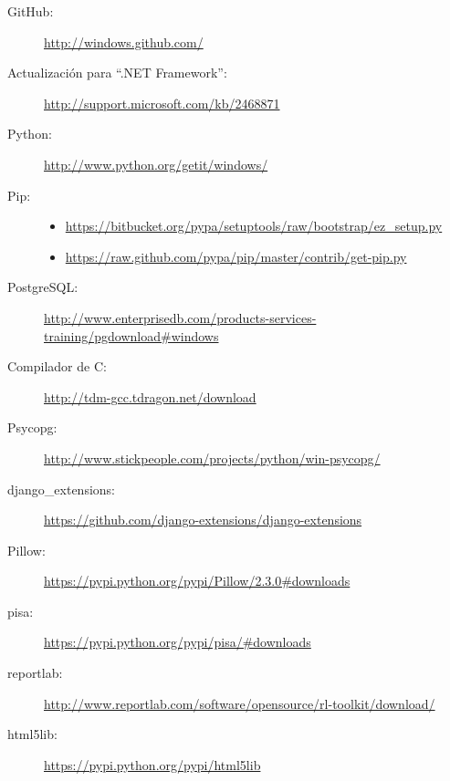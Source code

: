 \documentclass[9pt, letterpaper, oneside]{report}
\begin{document}
    \begin{description}
      \item[GitHub:] \url{http://windows.github.com/}

      \item[Actualización para ``.NET Framework'':]
        \url{http://support.microsoft.com/kb/2468871}

      \item[Python:] \url{http://www.python.org/getit/windows/}

      \item[Pip:]
        \begin{itemize}
          \item \url{https://bitbucket.org/pypa/setuptools/raw/bootstrap/ez\_setup.py}
          \item \url{https://raw.github.com/pypa/pip/master/contrib/get-pip.py}
        \end{itemize}

      \item[PostgreSQL:]
        \url{http://www.enterprisedb.com/products-services-training/pgdownload#windows}

      \item[Compilador de C:] \url{http://tdm-gcc.tdragon.net/download}
      
      \item[Psycopg:] \url{http://www.stickpeople.com/projects/python/win-psycopg/}

      \item[django\_extensions:]
        \url{https://github.com/django-extensions/django-extensions}

      \item[Pillow:] \url{https://pypi.python.org/pypi/Pillow/2.3.0#downloads}

      \item[pisa:] \url{https://pypi.python.org/pypi/pisa/#downloads}

      \item[reportlab:]
        \url{http://www.reportlab.com/software/opensource/rl-toolkit/download/}

      \item[html5lib:] \url{https://pypi.python.org/pypi/html5lib}

    \end{description}
\end{document}
